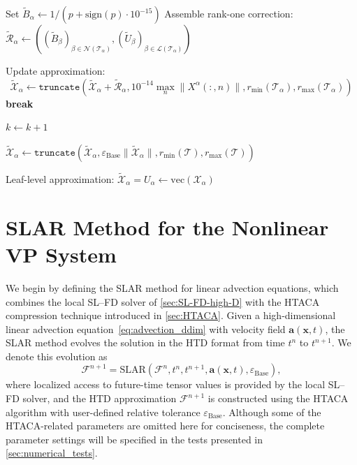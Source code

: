 \documentclass{article}
\theoremstyle{plain}
\theoremstyle{definition}
\theoremstyle{remark}
\begin{document}
\begin{algorithm}[h!]
\begin{algorithmic}[1]
    \State Set $\widetilde{B}_\alpha \gets 1 / (p + \text{sign}(p)\cdot 10^{-15})$
    \State Assemble rank-one correction:
    $\widetilde{\mathcal{R}}_\alpha \gets
      ((\widetilde{B}_\beta)_{\beta\in\mathcal{N}(\mathcal{T}_\alpha)},
       (\widetilde{U}_\beta)_{\beta\in\mathcal{L}(\mathcal{T}_\alpha)})$

    \State Update approximation:
     \begin{equation*}
         \widetilde{\mathcal{X}}_\alpha \gets
    \texttt{truncate}\left(\widetilde{\mathcal{X}}_\alpha + \widetilde{\mathcal{R}}_\alpha,
      10^{-14}\max_n \|X^\alpha(:,n)\|,
      r_{\min}(\mathcal{T}_\alpha), r_{\max}(\mathcal{T}_\alpha)\right)
     \end{equation*}
      \State \textbf{break}
    \EndIf

    \State $k \gets k+1$
  \EndWhile

    \State $\widetilde{\mathcal{X}}_\alpha \gets
      \texttt{truncate}\left(\widetilde{\mathcal{X}}_\alpha,
      \varepsilon_{\text{Base}}\|\widetilde{\mathcal{X}}_\alpha\|,
      r_{\min}(\mathcal{T}), r_{\max}(\mathcal{T})\right)$
  \EndIf

\Else
  \State Leaf-level approximation:
  $\widetilde{\mathcal{X}}_\alpha = U_\alpha \gets \text{vec}(\mathcal{X}_\alpha)$
\EndIf

\end{algorithmic}
\end{algorithm}



\section{SLAR Method for the Nonlinear VP System}\label{sec:SLAR}

We begin by defining the SLAR method for linear advection equations, which combines the local SL--FD solver of \cref{sec:SL-FD-high-D} with the HTACA compression technique introduced in \cref{sec:HTACA}.  
Given a high-dimensional linear advection equation~\eqref{eq:advection_ddim} with velocity field $\bm{a}(\bm{x}, t)$, the SLAR method evolves the solution in the HTD format from time $t^n$ to $t^{n+1}$.  
We denote this evolution as
\begin{equation*}
    \mathcal{F}^{n+1} = \text{SLAR}(\mathcal{F}^n, t^n, t^{n+1}, \bm{a}(\bm{x}, t), \varepsilon_{\text{Base}}),
\end{equation*}
where localized access to future-time tensor values is provided by the local SL--FD solver, and the HTD approximation $\mathcal{F}^{n+1}$ is constructed using the HTACA algorithm with user-defined relative tolerance $\varepsilon_{\text{Base}}$.  
Although some of the HTACA-related parameters are omitted here for conciseness, the complete parameter settings will be specified in the tests presented in \cref{sec:numerical_tests}.
\end{document}
